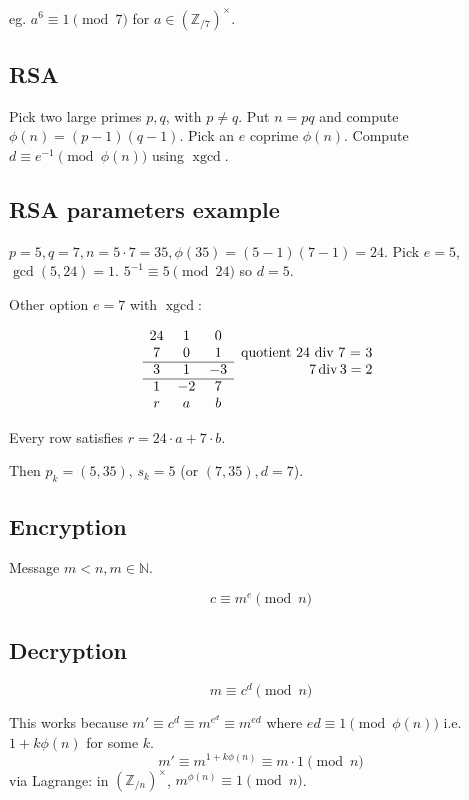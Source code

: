\documentclass{article}
\newcommand{\ZZ}{\mathbb{Z}}
\newcommand{\NN}{\mathbb{N}}
\newcommand{\xgcd}{\operatorname{xgcd}}
\newcommand{\ZZx}[1]{(\ZZ_{/#1})^\times}
\begin{document}
eg. $a^6 \equiv 1 \pmod{7}$ for $a \in \ZZx{7}$.

\subsection{RSA}

Pick two large primes $p, q$, with $p \ne q$. Put $n = pq$ and compute $\phi(n) = (p-1)(q-1)$.
Pick an $e$ coprime $\phi(n)$. Compute $d \equiv e^{-1} \pmod{\phi(n)}$ using $\xgcd$.

\subsection{RSA parameters example}\label{sec:rsaexample}

$p = 5, q = 7, n = 5 \cdot 7 = 35, \phi(35) = (5 - 1)(7-1) = 24$. Pick $e = 5$, $\gcd(5, 24) = 1$.
$5^{-1} \equiv 5 \pmod{24}$ so $d=5$.

Other option $e = 7$ with $\xgcd$:

$$\begin{array}{cccr}
    24 & 1 & 0 &                              \\
    7  & 0 & 1 & \text{quotient 24 div 7 = 3} \\
    \cline{1-3}
    3  & 1 & -3 & 7 \operatorname{div} 3 = 2 \\
    \cline{1-3}
    1 & -2 & 7 & \\
    r & a  & b &
\end{array}$$

Every row satisfies $r = 24 \cdot a + 7 \cdot b$.

Then $p_k = (5, 35), \, s_k = 5$ (or $(7, 35), d=7$).

\subsection{Encryption}
Message $m < n, m \in \NN$.

\[ c \equiv m^e \pmod{n} \]

\subsection{Decryption}

\[ m \equiv c^d \pmod{n} \]

This works because $m' \equiv c^d \equiv m^{e^d} \equiv m^{ed}$ where
$ed \equiv 1 \pmod{\phi(n)}$ i.e. $1 + k\phi(n)$ for some $k$.
\[ m' \equiv m^{1 + k \phi(n)} \equiv m \cdot 1 \pmod{n} \] via Lagrange:
in $\ZZx{n}$, $m^{\phi(n)} \equiv 1 \pmod{n}$.
\end{document}
